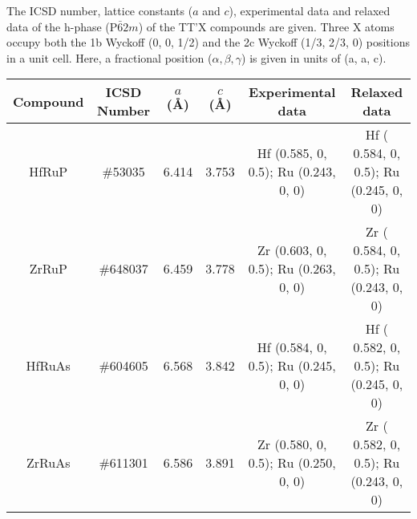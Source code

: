 \begin{table}[!h]\scriptsize
    \centering
    {The ICSD number, lattice constants ($a$ and $c$), experimental data and relaxed data of the h-phase (P$\bar 62m$) of the TT'X compounds are given. Three X atoms occupy both the 1b Wyckoff (0, 0, 1/2) and the 2c Wyckoff (1/3, 2/3, 0) positions in a unit cell. Here, a fractional position ($\alpha,\beta,\gamma$) is given in units of (a, a, c). ~\citep{qian2019npj}
    }\label{tab:str}
    \begin{tabular} {cccccc}
    \hline
      Compound  & ICSD Number& $a$ (\AA) & $c$ (\AA)  & Experimental data & Relaxed data \\
    \hline
    HfRuP & \#53035\cite{Meisner1983} & 6.414 & 3.753  &  Hf (0.585, 0, 0.5); Ru (0.243, 0, 0) &  Hf ( 0.584, 0, 0.5); Ru (0.245, 0, 0)  \\
    ZrRuP & \#648037\cite{Meisner1983}& 6.459 & 3.778  &  Zr (0.603, 0, 0.5); Ru (0.263, 0, 0) &  Zr ( 0.584, 0, 0.5); Ru (0.243, 0, 0)  \\
    HfRuAs&\#604605\cite{Meisner1983}  &6.568 &3.842   &  Hf (0.584, 0, 0.5); Ru (0.245, 0, 0) &  Hf ( 0.582, 0, 0.5); Ru (0.245, 0, 0)  \\
    ZrRuAs& \#611301\cite{MEISNER1983983} & 6.586 &3.891  &  Zr (0.580, 0, 0.5); Ru (0.250, 0, 0) &  Zr ( 0.582, 0, 0.5); Ru (0.243, 0, 0)  \\
    \hline
    \end{tabular}
\end{table}

